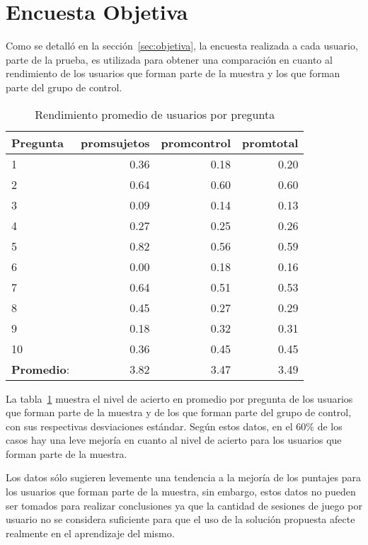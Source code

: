 \section{Encuesta Objetiva}
\label{sec:res_objetiva}

Como se detalló en la sección~\ref{sec:objetiva}, la encuesta realizada a cada
usuario, parte de la prueba, es utilizada para obtener una comparación en cuanto
al rendimiento de los usuarios que forman parte de la muestra y los que forman
parte del grupo de control.


\begin{table}[!hbt]
\centering
\begin{tabular}{lrrr}
\toprule
\textbf{Pregunta} & 
\textbf{promsujetos} & 
\textbf{promcontrol} & 
\textbf{promtotal} \\ 
\midrule
1         & 0.36 & 0.18 & 0.20 \\
2         & 0.64 & 0.60 & 0.60 \\
3         & 0.09 & 0.14 & 0.13 \\
4         & 0.27 & 0.25 & 0.26 \\
5         & 0.82 & 0.56 & 0.59 \\
6         & 0.00 & 0.18 & 0.16 \\
7         & 0.64 & 0.51 & 0.53 \\
8         & 0.45 & 0.27 & 0.29 \\
9         & 0.18 & 0.32 & 0.31 \\
10        & 0.36 & 0.45 & 0.45 \\
\midrule
\textbf{Promedio}: & 3.82 & 3.47 & 3.49  \\
\bottomrule
\end{tabular}
\caption{Rendimiento promedio de usuarios por pregunta}
\label{tab:objetiva_rendimiento_por_pregunta}
\end{table}

La tabla~\ref{tab:objetiva_rendimiento_por_pregunta} muestra el nivel de acierto
en promedio por pregunta de los usuarios que forman parte de la muestra y de los
que forman parte del grupo de control, con sus respectivas desviaciones
estándar. Según estos datos, en el $60\%$ de los casos hay una leve mejoría en
cuanto al nivel de acierto para los usuarios que forman parte de la muestra.

Los datos sólo sugieren levemente una tendencia a la mejoría de los puntajes
para los usuarios que forman parte de la muestra, sin embargo, estos datos no
pueden ser tomados para realizar conclusiones ya que la cantidad de sesiones de
juego por usuario no se considera suficiente para que el uso de la solución
propuesta afecte realmente en el aprendizaje del mismo.
